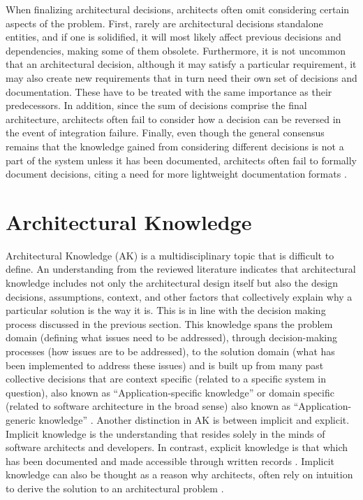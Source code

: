         When finalizing architectural decisions, architects often omit considering certain aspects of the problem. First, rarely are architectural decisions standalone entities, and if one is solidified, it will most likely affect previous decisions and dependencies, making some of them obsolete. Furthermore, it is not uncommon that an architectural decision, although it may satisfy a particular requirement, it may also create new requirements that in turn need their own set of decisions and documentation. These have to be treated with the same importance as their predecessors. In addition, since the sum of decisions comprise the final architecture, architects often fail to consider how a decision can be reversed in the event of integration failure. Finally, even though the general consensus remains that the knowledge gained from considering different decisions is not a part of the system unless it has been documented, architects often fail to formally document decisions, citing a need for more lightweight documentation formats \cite{decision_documentation_overview, decision_making_survey_challenges} .

    \section{Architectural Knowledge}
        Architectural Knowledge (AK) is a multidisciplinary topic that is difficult to define. 
        An understanding from the reviewed literature \cite{architectural_knowledge_definitions} indicates that architectural knowledge includes not only the architectural design itself but also the design decisions, assumptions, context, and other factors that collectively explain why a particular solution is the way it is. This is in line with the decision making process discussed in the previous section. This knowledge spans the problem domain (defining what issues need to be addressed), through decision-making processes (how issues are to be addressed), to the solution domain (what has been implemented to address these issues) and is built up from many past collective decisions that are context specific (related to a specific system in question), also known as ``Application-specific knowledge'' or domain specific (related to software architecture in the broad sense) also known as ``Application-generic knowledge'' \cite{Patterns+ArchDecisions}. Another distinction in AK is between implicit and explicit. Implicit knowledge is the understanding that resides solely in the minds of software architects and developers. In contrast, explicit knowledge is that which has been documented and made accessible through written records \cite{AK_And_Knowledge_Management}. Implicit knowledge can also be thought as a reason why architects, often rely on intuition to derive the solution to an architectural problem \cite{Patterns+ArchDecisions, archtitect_survey}.

